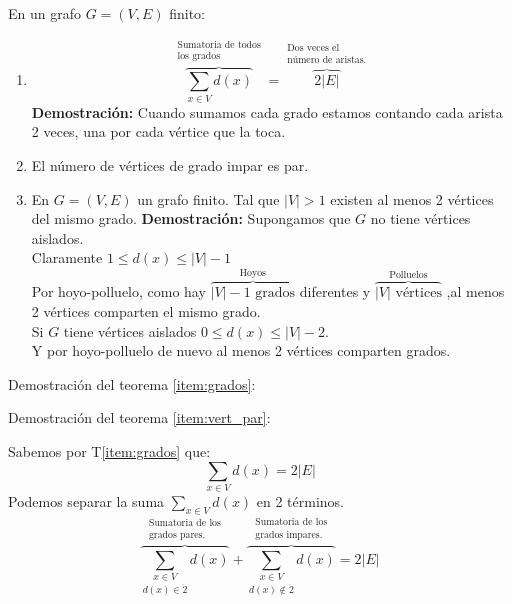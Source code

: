 \documentclass[../main.tex]{subfiles}
\begin{document}
En un grafo $G=(V,E)$ finito:
\begin{enumerate}
	\item\label{item:grados}
		\[
			\overbrace
			{
				\sum_{x\in V} d(x)
			}^
			{
				\substack
				{
					\text{Sumatoria de todos}\\
					\text{los grados}
				}
			}
			=
			\overbrace
			{
				2|E|
			}^
			{
				\substack
				{
					\text{Dos veces el}\\
					\text{número de aristas.}
				}
			}
		\]
		\subitem \textbf{Demostración:}
			Cuando sumamos cada grado estamos contando cada arista 2 veces,
			una por cada vértice que la toca.
		\item\label{item:vert_par}
		El número de vértices de grado impar es par.
	\item En $G=(V,E)$ un grafo finito.
		Tal que $|V| > 1$ existen al menos 2 vértices del mismo grado.
		\subitem \textbf{Demostración:}
			Supongamos que $G$ no tiene vértices aislados.\\
			Claramente $1\leq d(x) \leq |V| - 1$\\
			Por hoyo-polluelo, como hay
			\(
				\overbrace
				{
					|V|-1 \text{ grados}
				}^
				{
					\text{Hoyos}
				}
			\)
			diferentes y
			\(
				\overbrace
				{
					|V| \text{ vértices}
				}^
				{
					\text{Polluelos}
				}
			\)
			,al menos 2 vértices comparten el mismo grado.\\
			Si $G$ tiene vértices aislados $0\leq d(x)\leq |V|-2$.\\
			Y por hoyo-polluelo de nuevo al menos 2 vértices comparten grados.
\end{enumerate}
Demostración del teorema \ref{item:grados}:

\begin{figure}[H]
	\centering
	
\end{figure}

Demostración del teorema \ref{item:vert_par}:

Sabemos por T\ref{item:grados} que:
\[
	\sum_{x\in V} d(x) = 2|E|
\]
Podemos separar la suma $\sum_{x\in V}d(x)$ en 2 términos.
\[
	\overbrace
	{
		\underset
		{
			d(x)\in\dot{2}
		}
		{
			\sum_{x\in V}
		}d(x)
	}^
	{
		\substack
		{
			\text{Sumatoria de los}\\
			\text{grados pares.}
		}
	}
	+
	\overbrace
	{
		\underset
		{
			d(x)\notin\dot{2}
		}
		{
			\sum_{x\in V}
		}d(x)
	}^
	{
		\substack
		{
			\text{Sumatoria de los}\\
			\text{grados impares.}
		}
	}
	=2|E|
\]
\end{document}
